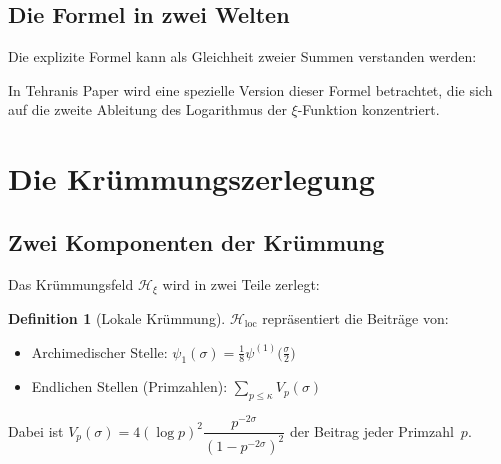 \documentclass[11pt,a4paper]{article}
\newcommand{\Hxi}{\mathcal{H}_{\xi}}
\newcommand{\Hlocal}{\mathcal{H}_{\mathrm{loc}}}
\theoremstyle{definition}
\newtheorem{definition}{Definition}[section]
\theoremstyle{remark}
\begin{document}
	\subsection{Die Formel in zwei Welten}
	
	Die explizite Formel kann als Gleichheit zweier Summen verstanden werden:
	
	\begin{center}
	\end{center}
	
	In Tehranis Paper wird eine spezielle Version dieser Formel betrachtet, die sich auf
	die zweite Ableitung des Logarithmus der $\xi$-Funktion konzentriert.
	
	\section{Die Kr\"ummungszerlegung}\label{sec:kruemmungszerlegung}
	
	\subsection{Zwei Komponenten der Kr\"ummung}
	
	Das Kr\"ummungsfeld $\Hxi$ wird in zwei Teile zerlegt:
	
	\begin{definition}[Lokale Kr\"ummung]
		$\Hlocal$ repr\"asentiert die Beitr\"age von:
		\begin{itemize}
			\item Archimedischer Stelle: $\psi_1(\sigma) = \frac{1}{8}\psi^{(1)}\!\bigl(\frac{\sigma}{2}\bigr)$
			\item Endlichen Stellen (Primzahlen): $\sum_{p \leq \kappa} V_p(\sigma)$
		\end{itemize}
		
		Dabei ist $V_p(\sigma) = 4(\log p)^2 \dfrac{p^{-2\sigma}}{(1-p^{-2\sigma})^2}$ der Beitrag jeder Primzahl~$p$.
	\end{definition}
	
\end{document}
